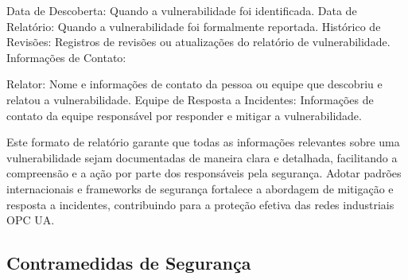 {    Data de Descoberta: Quando a vulnerabilidade foi identificada.
    Data de Relatório: Quando a vulnerabilidade foi formalmente reportada.
    Histórico de Revisões: Registros de revisões ou atualizações do relatório de vulnerabilidade.
    Informações de Contato:

    Relator: Nome e informações de contato da pessoa ou equipe que descobriu e relatou a vulnerabilidade.
    Equipe de Resposta a Incidentes: Informações de contato da equipe responsável por responder e mitigar a vulnerabilidade.

    Este formato de relatório garante que todas as informações relevantes sobre uma vulnerabilidade sejam documentadas de maneira clara e detalhada, facilitando a compreensão e a ação por parte dos responsáveis pela segurança. Adotar padrões internacionais e frameworks de segurança fortalece a abordagem de mitigação e resposta a incidentes, contribuindo para a proteção efetiva das redes industriais OPC UA.
    }

    \subsection{Contramedidas de Segurança}

